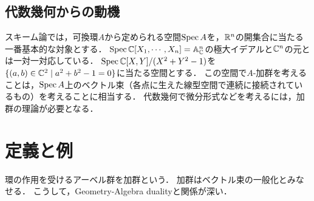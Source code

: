 \documentclass[uplatex,dvipdfmx]{jsreport}
\begin{document}
\subsection{代数幾何からの動機}

スキーム論では，可換環$A$から定められる空間$\mathrm{Spec}\, A$を，$\mathbb{R}^n$の開集合に当たる一番基本的な対象とする．
$\mathrm{Spec}\,\mathbb{C}[X_1,\cdots,X_n]=\mathbb{A}_{\mathbb{C}}^n$の極大イデアルと$\mathbb{C}^n$の元とは一対一対応している．
$\mathrm{Spec}\,\mathbb{C}[X,Y]/(X^2+Y^2-1)$を$\{(a,b)\in\mathbb{C}^2\mid a^2+b^2-1=0\}$に当たる空間とする．
この空間で$A$-加群を考えることは，$\mathrm{Spec}\, A$上のベクトル束（各点に生えた線型空間で連続に接続されているもの）を考えることに相当する．
代数幾何で微分形式などを考えるには，加群の理論が必要となる．

\section{定義と例}

\begin{tcolorbox}[colframe=ForestGreen, colback=ForestGreen!10!white,breakable,colbacktitle=ForestGreen!40!white,coltitle=black,fonttitle=\bfseries\sffamily,
title=]
    環の作用を受けるアーベル群を加群という．
    加群はベクトル束の一般化とみなせる．
    こうして，Geometry-Algebra dualityと関係が深い．
\end{tcolorbox}
\end{document}
